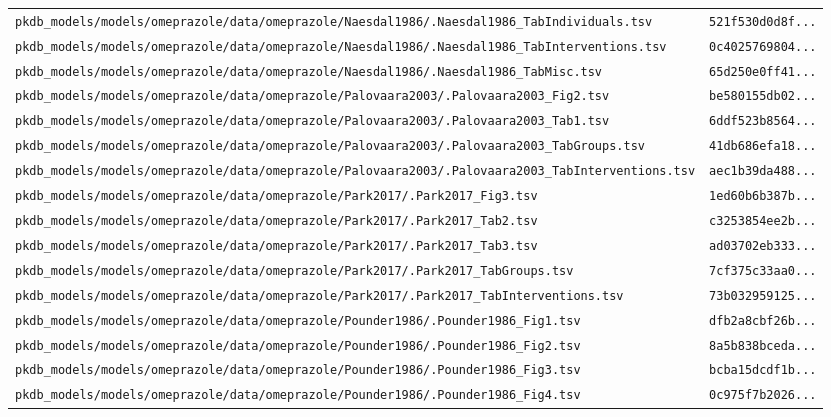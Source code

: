 \documentclass{article}
\begin{document}
\begin{longtable}{ll}
\texttt{pkdb\_models/models/omeprazole/data/omeprazole/Naesdal1986/.Naesdal1986\_TabIndividuals.tsv} & \texttt{521f530d0d8f...} \\
\texttt{pkdb\_models/models/omeprazole/data/omeprazole/Naesdal1986/.Naesdal1986\_TabInterventions.tsv} & \texttt{0c4025769804...} \\
\texttt{pkdb\_models/models/omeprazole/data/omeprazole/Naesdal1986/.Naesdal1986\_TabMisc.tsv} & \texttt{65d250e0ff41...} \\
\texttt{pkdb\_models/models/omeprazole/data/omeprazole/Palovaara2003/.Palovaara2003\_Fig2.tsv} & \texttt{be580155db02...} \\
\texttt{pkdb\_models/models/omeprazole/data/omeprazole/Palovaara2003/.Palovaara2003\_Tab1.tsv} & \texttt{6ddf523b8564...} \\
\texttt{pkdb\_models/models/omeprazole/data/omeprazole/Palovaara2003/.Palovaara2003\_TabGroups.tsv} & \texttt{41db686efa18...} \\
\texttt{pkdb\_models/models/omeprazole/data/omeprazole/Palovaara2003/.Palovaara2003\_TabInterventions.tsv} & \texttt{aec1b39da488...} \\
\texttt{pkdb\_models/models/omeprazole/data/omeprazole/Park2017/.Park2017\_Fig3.tsv} & \texttt{1ed60b6b387b...} \\
\texttt{pkdb\_models/models/omeprazole/data/omeprazole/Park2017/.Park2017\_Tab2.tsv} & \texttt{c3253854ee2b...} \\
\texttt{pkdb\_models/models/omeprazole/data/omeprazole/Park2017/.Park2017\_Tab3.tsv} & \texttt{ad03702eb333...} \\
\texttt{pkdb\_models/models/omeprazole/data/omeprazole/Park2017/.Park2017\_TabGroups.tsv} & \texttt{7cf375c33aa0...} \\
\texttt{pkdb\_models/models/omeprazole/data/omeprazole/Park2017/.Park2017\_TabInterventions.tsv} & \texttt{73b032959125...} \\
\texttt{pkdb\_models/models/omeprazole/data/omeprazole/Pounder1986/.Pounder1986\_Fig1.tsv} & \texttt{dfb2a8cbf26b...} \\
\texttt{pkdb\_models/models/omeprazole/data/omeprazole/Pounder1986/.Pounder1986\_Fig2.tsv} & \texttt{8a5b838bceda...} \\
\texttt{pkdb\_models/models/omeprazole/data/omeprazole/Pounder1986/.Pounder1986\_Fig3.tsv} & \texttt{bcba15dcdf1b...} \\
\texttt{pkdb\_models/models/omeprazole/data/omeprazole/Pounder1986/.Pounder1986\_Fig4.tsv} & \texttt{0c975f7b2026...} \\

\end{longtable}
\end{document}
